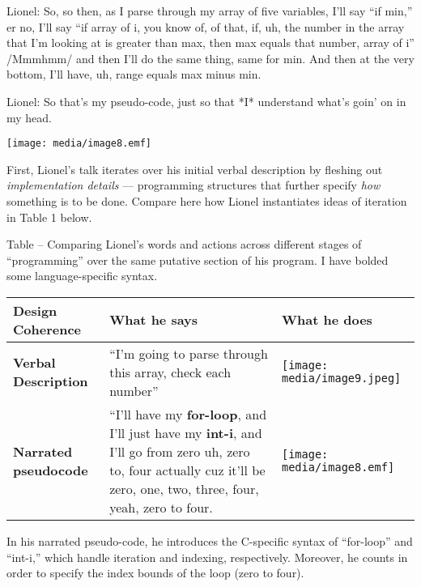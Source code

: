 Lionel: So, so then, as I parse through my array of five variables, I'll
say ``if min,'' er no, I'll say ``if array of i, you know of, of that,
if, uh, the number in the array that I'm looking at is greater than max,
then max equals that number, array of i'' /Mmmhmm/ and then I'll do the
same thing, same for min. And then at the very bottom, I'll have, uh,
range equals max minus min.

Lionel: So that's my pseudo-code, just so that *I* understand what's
goin' on in my head.

\texttt{[image: media/image8.emf]}

First, Lionel's talk iterates over his initial verbal description by
fleshing out \emph{implementation details} --- programming structures
that further specify \emph{how} something is to be done. Compare here
how Lionel instantiates ideas of iteration in Table 1 below.

\protect\hypertarget{ux5fToc252445959}{}{}Table -- Comparing Lionel's
words and actions across different stages of ``programming'' over the
same putative section of his program. I have bolded some
language-specific syntax.

\begin{longtable}[]{@{}lll@{}}
\toprule
\textbf{Design Coherence} & What he says & What he does\tabularnewline
\midrule
\endhead
\textbf{Verbal Description} & ``I'm going to parse through this array,
check each number'' &
\texttt{[image: media/image9.jpeg]}\tabularnewline
\textbf{Narrated pseudocode} & ``I'll have my \textbf{for-loop}, and
I'll just have my \textbf{int-i}, and I'll go from zero uh, zero to,
four actually cuz it'll be zero, one, two, three, four, yeah, zero to
four. &
\texttt{[image: media/image8.emf]}\tabularnewline
\bottomrule
\end{longtable}

In his narrated pseudo-code, he introduces the C-specific syntax of
``for-loop'' and ``int-i,'' which handle iteration and indexing,
respectively. Moreover, he counts in order to specify the index bounds
of the loop (zero to four).

